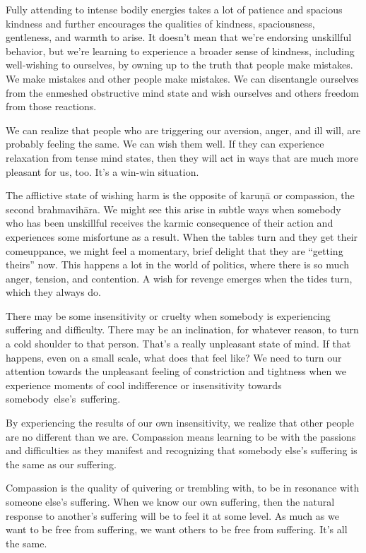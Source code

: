 \enlargethispage{1\baselineskip}
Fully attending to intense bodily energies takes a lot of patience and spacious kindness and further encourages the qualities of kindness, spaciousness, gentleness, and warmth to arise. It doesn't mean that we're endorsing unskillful behavior, but we're learning to experience a broader sense of kindness, including well-wishing to ourselves, by owning up to the truth that people make mistakes. We make mistakes and other people make mistakes. We can disentangle ourselves from the enmeshed obstructive mind state and wish ourselves and others freedom from those reactions.

We can realize that people who are triggering our aversion, anger, and ill will, are probably feeling the same. We can wish them well. If they can experience relaxation from tense mind states, then they will act in ways that are much more pleasant for us, too. It's a win-win situation.

The afflictive state of wishing harm is the opposite of karuṇā or compassion, the second brahmavihāra. We might see this arise in subtle ways when somebody who has been unskillful receives the karmic consequence of their action and experiences some misfortune as a result. When the tables turn and they get their comeuppance, we might feel a momentary, brief delight that they are ``getting theirs'' now. This happens a lot in the world of politics, where there is so much anger, tension, and contention. A wish for revenge emerges when the tides turn, which they always do.

There may be some insensitivity or cruelty when somebody is experiencing suffering and difficulty. There may be an inclination, for whatever reason, to turn a cold shoulder to that person. That's a really unpleasant state of mind. If that happens, even on a small scale, what does that feel like? We need to turn our attention towards the unpleasant feeling of constriction and tightness when we experience moments of cool indifference or insensitivity towards \mbox{somebody else's suffering.}

By experiencing the results of our own insensitivity, we realize that other people are no different than we are. Compassion means learning to be with the passions and difficulties as they manifest and recognizing that somebody else's suffering is the same as our suffering.

Compassion is the quality of quivering or trembling with, to be in resonance with someone else's suffering. When we know our own suffering, then the natural response to another's suffering will be to feel it at some level. As much as we want to be free from suffering, we want others to be free from suffering. It's all the same.

